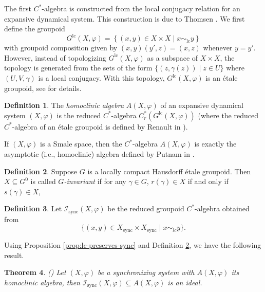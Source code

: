 \documentclass{amsart}
\newcommand{\lc}{\text{lc}}
\theoremstyle{plain}
\newtheorem{theorem}{Theorem}[section]
\theoremstyle{definition}
\newtheorem{definition}[theorem]{Definition}
\theoremstyle{remark}
\begin{document}
The first $C^\ast$-algebra is constructed from the local conjugacy relation for an expansive dynamical system. This construction is due to Thomsen \cite{thomsen2010c}. We first define the groupoid \[ G^\lc(X, \varphi) = \left\{ (x,y) \in X \times X \mid x \sim_\lc y \right\} \] with groupoid composition given by $(x,y)(y',z) = (x,z)$ whenever $y = y'$.  However, instead of topologizing $G^\lc(X, \varphi)$ as a subspace of $X \times X$, the topology is generated from the sets of the form $\{(z,\gamma(z)) \mid z \in U\}$ where $(U, V, \gamma)$ is a local conjugacy. With this topology, $G^\lc(X, \varphi)$ is an \'{e}tale groupoid, see \cite[Theorem 1.7]{thomsen2010c} for details.

\begin{definition}
The \emph{homoclinic algebra} $A(X,\varphi)$ of an expansive dynamical system $(X,\varphi)$ is the reduced $C^\ast$-algebra $C_r^\ast(G^\lc(X, \varphi))$ (where the reduced $C^\ast$-algebra of an \'etale groupoid is defined by Renault in \cite{renault1980groupoid}). 
\end{definition}

If $(X,\varphi)$ is a Smale space, then the $C^\ast$-algebra $A(X,\varphi)$ is exactly the asymptotic (i.e., homoclinic) algebra defined by Putnam in \cite{putnam_1996}. 

\begin{definition}\label{def:g-invariant}
Suppose $G$ is a locally compact Hausdorff \'{e}tale groupoid.  Then $X \subseteq G^0$ is called \emph{$G$-invariant} if for any $\gamma \in G$, $r(\gamma) \in X$ if and only if $s(\gamma) \in X$, 
\end{definition}

\begin{definition}
Let $\mathcal{I}_\text{sync}(X,\varphi)$ be the reduced groupoid $C^\ast$-algebra obtained from 
\[ \{ (x, y) \in X_\text{sync} \times X_\text{sync} \mid x \sim_{lc} y \}. \]
\end{definition}

Using Proposition \ref{prop:lc-preserves-sync} and Definition \ref{def:g-invariant}, we have the following result.

\begin{theorem}\label{theorem:sync-ideal} (\cite[Section 5.4]{DeeSto})
Let $(X,\varphi)$ be a synchronizing system with $A(X,\varphi)$ its homoclinic algebra, then $\mathcal{I}_\text{sync}(X,\varphi) \subseteq A(X,\varphi)$ is an ideal.
\end{theorem}
\end{document}
